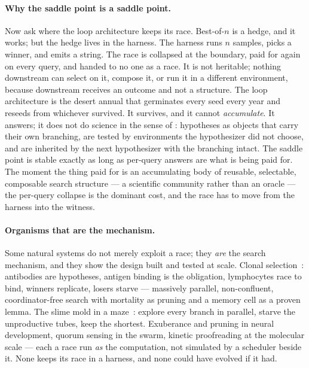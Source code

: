 \paragraph{Why the saddle point is a saddle point.}
Now ask where the loop architecture keeps its race.
Best-of-$n$ is a hedge, and it works; but the hedge lives in the harness.
The harness runs $n$ samples, picks a winner, and emits a string.
The race is collapsed at the boundary, paid for again on every query,
and handed to no one as a race.
It is not heritable; nothing downstream can select on it, compose it,
or run it in a different environment, because downstream receives an
outcome and not a structure.
The loop architecture is the desert annual that germinates every seed
every year and reseeds from whichever survived.
It survives, and it cannot \emph{accumulate}.
It answers; it does not do science in the sense of \chSci: hypotheses as
objects that carry their own branching, are tested by environments the
hypothesizer did not choose, and are inherited by the next hypothesizer
with the branching intact.
The saddle point is stable exactly as long as per-query answers are what
is being paid for.
The moment the thing paid for is an accumulating body of reusable,
selectable, composable search structure --- a scientific community
rather than an oracle --- the per-query collapse is the dominant cost,
and the race has to move from the harness into the witness.

\paragraph{Organisms that are the mechanism.}
Some natural systems do not merely exploit a race; they \emph{are} the
search mechanism, and they show the design built and tested at scale.
Clonal selection~\cite{Burnet59}: antibodies are hypotheses, antigen
binding is the obligation, lymphocytes race to bind, winners replicate,
losers starve --- massively parallel, non-confluent, coordinator-free
search with mortality as pruning and a memory cell as a proven lemma.
The slime mold in a maze~\cite{Nakagaki00}: explore every branch in
parallel, starve the unproductive tubes, keep the shortest.
Exuberance and pruning in neural development, quorum sensing in the
swarm, kinetic proofreading at the molecular scale --- each a race run
\emph{as} the computation, not simulated by a scheduler beside it.
None keeps its race in a harness, and none could have evolved if it had.


